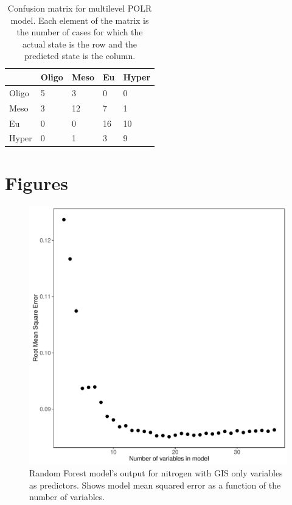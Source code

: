 \documentclass[fleqn,10pt,lineno]{wlpeerj} %
\begin{document}
\begin{table}[ht]
\caption {Confusion matrix for multilevel POLR model. Each element of the matrix is the number of cases for which the actual state is the row and the predicted state is the column.}
\label{tab:MultiPOLRCM}
\centering
\begin{tabular}{lllll}
  \hline
 & Oligo & Meso & Eu & Hyper \\ 
  \hline
  Oligo & 5 & 3 & 0 & 0 \\
  Meso & 3 & 12 & 7 & 1 \\
  Eu & 0 & 0 & 16 & 10 \\
  Hyper & 0 & 1 & 3 & 9 \\
   \hline
\end{tabular}
\end{table}

\hypertarget{figures}{%
\section*{Figures}\label{figures}}

\begin{figure}
  \includegraphics[scale=0.5]{gis_vs_NTL.pdf}
  \caption{Random Forest model's output for nitrogen with GIS only variables as predictors. Shows model mean squared error as a function of the number of variables.}
  \label{fig:gis_vs_NTL}
\end{figure}
\end{document}
